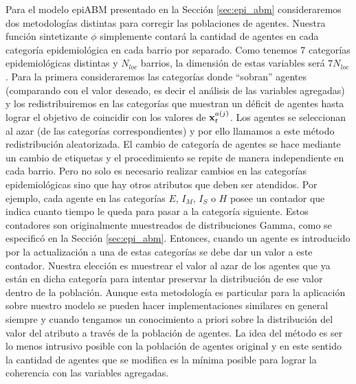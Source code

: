 Para el modelo epiABM presentado en la Sección \ref{sec:epi_abm} consideraremos dos metodologías distintas para corregir las poblaciones de agentes. Nuestra función sintetizante $\phi$ simplemente contará la cantidad de agentes en cada categoría epidemiológica en cada barrio por separado. Como tenemos 7 categorías epidemiológicas distintas y $N_{loc}$ barrios, la dimensión de estas variables será $7 N_{loc}$. Para la primera consideraremos las categorías donde ``sobran'' agentes (comparando con el valor deseado, es decir el análisis de las variables agregadas) y los redistribuiremos en las categorías que muestran un déficit de agentes hasta lograr el objetivo de coincidir con los valores de $\mathbf{x}_t^{a(j)}$. Los agentes se seleccionan al azar (de las categorías correspondientes) y por ello llamamos a este método redistribución aleatorizada. El cambio de categoría de agentes se hace mediante un cambio de etiquetas y el procedimiento se repite de manera independiente en cada barrio. Pero no solo es necesario realizar cambios en las categorías epidemiológicas sino que hay otros atributos que deben ser atendidos. Por ejemplo, cada agente en las categorías $E$, $I_M$, $I_S$ o $H$ posee un contador que indica cuanto tiempo le queda para pasar a la categoría siguiente. Estos contadores son originalmente muestreados de distribuciones Gamma, como se especificó en la Sección \ref{sec:epi_abm}. Entonces, cuando un agente es introducido por la actualización a una de estas categorías se debe dar un valor a este contador. Nuestra elección es muestrear el valor al azar de los agentes que ya están en dicha categoría para intentar preservar la distribución de ese valor dentro de la población. Aunque esta metodología es particular para la aplicación sobre nuestro modelo se pueden hacer implementaciones similares en general siempre y cuando tengamos un conocimiento a priori sobre la distribución del valor del atributo a través de la población de agentes. La idea del método es ser lo menos intrusivo posible con la población de agentes original y en este sentido la cantidad de agentes que se modifica es la mínima posible para lograr la coherencia con las variables agregadas.

